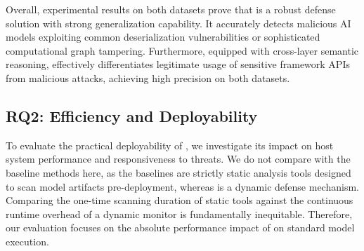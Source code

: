%
%

Overall, experimental results on both datasets prove that \toolname{} is a robust defense solution with strong generalization capability. It accurately detects malicious AI models exploiting common deserialization vulnerabilities or sophisticated computational graph tampering. Furthermore, equipped with cross-layer semantic reasoning, \toolname{} effectively differentiates legitimate usage of sensitive framework APIs from malicious attacks, achieving high precision on both datasets.

\label{sec:rq2}
\subsection{RQ2: Efficiency and Deployability}

To evaluate the practical deployability of \toolname{}, we investigate its impact on host system performance and responsiveness to threats. We do not compare \toolname{} with the baseline methods here, as the baselines are strictly static analysis tools designed to scan model artifacts pre-deployment, whereas \toolname{} is a dynamic defense mechanism. Comparing the one-time scanning duration of static tools against the continuous runtime overhead of a dynamic monitor is fundamentally inequitable. Therefore, our evaluation focuses on the absolute performance impact of \toolname{} on standard model execution.

